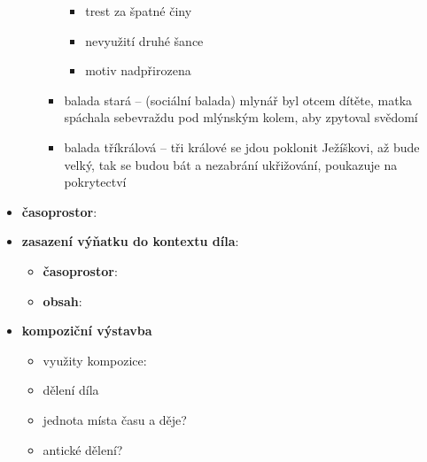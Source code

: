 \documentclass[10pt,a4paper]{article}
\begin{document}
\begin{itemize}
\begin{itemize}
\begin{itemize}
\begin{itemize}
			\item trest za špatné činy
			\item nevyužití druhé šance
			\item motiv nadpřirozena
			\end{itemize}
		\item balada stará -- (sociální balada) mlynář byl otcem dítěte, matka spáchala sebevraždu pod mlýnským kolem, aby zpytoval svědomí
		\item balada tříkrálová -- tři králové se jdou poklonit Ježíškovi, až bude velký, tak se budou bát a nezabrání ukřižování, poukazuje na pokrytectví
		\end{itemize}
	\end{itemize}
\item \textbf{časoprostor}:
\item \textbf{zasazení výňatku do kontextu díla}:
	\begin{itemize}
	\item \textbf{časoprostor}:
	\item \textbf{obsah}: 
	\end{itemize}
\item \textbf{kompoziční výstavba}
	\begin{itemize}
	\item využity kompozice: 
	\item dělení díla
	\item jednota místa času a děje?
	\item antické dělení?
	\end{itemize}
\end{itemize}
\end{document}
